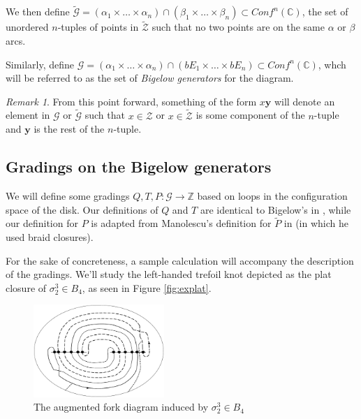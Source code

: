 \documentclass[11pt]{article}
\theoremstyle{plain} \newtheorem{thm}{Theorem}[subsection]
\theoremstyle{plain} \newtheorem{cor}[thm]{Corollary}
\theoremstyle{plain} \newtheorem{prop}[thm]{Proposition}
\theoremstyle{plain} \newtheorem{conj}[thm]{Conjecture}
\theoremstyle{plain} \newtheorem{lem}[thm]{Lemma}
\theoremstyle{definition} \newtheorem{df}[thm]{Definition}
\theoremstyle{remark} \newtheorem{rmk}[thm]{Remark}
\theoremstyle{remark} \newtheorem{obs}[thm]{Observation}
\newcommand{\B}[1]{B_{#1} }
\newcommand{\Ztil}{\tld{\mathcal{Z}}}
\newcommand{\Zcal}{\mathcal{Z}}
\newcommand{\G}{\mathcal{G}}
\newcommand{\tld}[1]{\widetilde{#1}}
\newcommand{\Gtil}{\tld{\mathcal{G}}}
\newcommand{\confC}{Conf^{n}(\mathbb{C})}
\newcommand{\by}{\mathbf{y}}
\begin{document}
We then define $\Gtil = (\alpha_{1} \times \ldots \times \alpha_{n}) \cap (\beta_{1} \times \ldots \times \beta_{n})\subset \confC$,
the set of unordered $n$-tuples of points in $\Ztil$ such that no two points are on the same $\alpha$ or  $\beta$ arcs.

Similarly, define $\G = (\alpha_{1} \times \ldots \times \alpha_{n}) \cap (bE_{1} \times \ldots \times bE_{n}) \subset \confC$, whch will be referred to as the set of \textit{Bigelow generators} for the diagram.

\begin{rmk}
From this point forward, something of the form $x\by$ will denote an element in $\G$ or $\Gtil$ such that $x \in \Zcal$ or $x \in \Ztil$ is some component of the $n$-tuple and $\by$ is the rest of the $n$-tuple.
\end{rmk}

\subsection{Gradings on the Bigelow generators}\label{sec:gradings}

We will define some gradings $Q,T, P: \G \rightarrow \mathbb{Z}$ based on loops in the configuration space of the disk.  Our definitions of $Q$ and $T$ are identical to Bigelow's in \cite{big:jones}, while our definition for $P$ is adapted from Manolescu's definition for $\tld{P}$ in \cite{cm:R} (in which he used braid closures).

For the sake of concreteness, a sample calculation will accompany the description of the gradings.  We'll study the left-handed trefoil knot depicted as the plat closure of $\sigma_{2}^{3} \in  \B{4}$, as seen in Figure \ref{fig:explat}.

\begin{figure}[h!]
\centering
\begin{minipage}[c]{.36\linewidth}
\centering\includegraphics[height = 35mm]{ExFork2}
\end{minipage}
\begin{minipage}[c]{.62\linewidth}
\centering \caption[An augmented fork diagram]{The augmented fork diagram induced by $\sigma_{2}^{3} \in  \B{4}$} \label{fig:exfork}
\end{minipage}
\end{figure}
\end{document}
